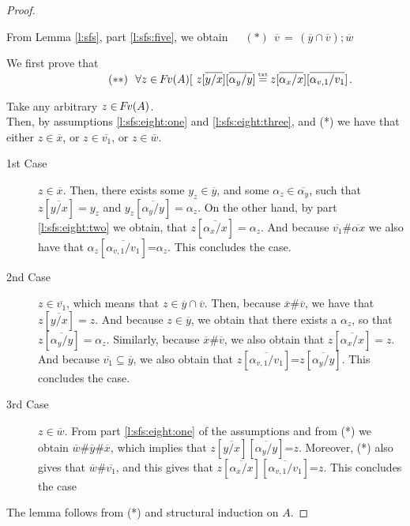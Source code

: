 \begin{proof}
$ ~ $

From Lemma \ref{l:sfs}, part \ref{l:sfs:five}, we obtain\  \ \ $(*)\ \  \overline v \, = \, (\overline {y}\cap\overline{v}); \overline w $

We first prove that \\
$\strut \hspace{3cm} \ \  (**) \ \  \forall z\in \fv(A)[\ z [\overline{y/x}] [\overline{\alpha_y/y}]   \txteq z [\overline{\alpha_x/x}] [\overline{\alpha_{v,1}/v_1}] $.
 
Take any arbitrary $z\in {\hspace{-1pt}F\hspace{-1pt}}v(A)$. \\
Then, by assumptions \ref{l:sfs:eight:one} and \ref{l:sfs:eight:three}, and (*) we have that either $z\in \overline x$, or $z\in \overline {v_1}$, or 
$z\in \overline {w}$.
 
  \begin{description}
 \item
 [  {1st Case}]  
 $z\in \overline x$. 
 Then, there exists some $y_z\in \overline y$, and some $\alpha_z \in \overline {\alpha_y}$, such that    $z[\overline{y/x}]=y_z$  and
  $y_z [\overline{\alpha_y/y}] = \alpha_z$. 
  On the other hand,   by part \ref{l:sfs:eight:two} we obtain, that  $z[\overline{\alpha_x/x}] =\alpha_z$.
  And because $\overline {v_1}\# \overline {\alpha x}$ we also have that $\alpha_z[\overline{\alpha_{v,1}/v_1}] $=$\alpha_z$. 
  This concludes the case.
  \item
   [  {2nd Case}]  
$ z\in \overline {v_1}$, which means that $ z\in \overline {y}\cap\overline{v}$. Then, because $\overline x \# \overline  v$, we have that $z[\overline{y/x}]=z$. 
And because $z\in \overline y$, we obtain that there exists a $\alpha_z$, so that  $z [\overline{\alpha_y/y}] = \alpha_z$.
Similarly, because  $\overline x \# \overline  v$, we also obtain that $z[\overline{\alpha_x/x}]=z$.
And because $\overline {v_1} \subseteq \overline y$, we also obtain that $z[\overline {\alpha_{v,1}/v_1}]$=$z[\overline {\alpha_{y}/y}]$.
This concludes the case.
  \item
     [   {3rd Case}]  
  $z\in \overline {w}$. From part  \ref{l:sfs:eight:one} of the assumptions and from (*) we obtain  $\overline {w} \#  \overline {y}\# \overline {x}$, which implies  that $z [\overline{y/x}] [\overline{\alpha_y/y}]$=$z$.
  Moreover, (*) also gives that $\overline {w} \#  \overline {v_1}$, and this gives that
  $z[\overline{\alpha_x/x}] [\overline{\alpha_{v,1}/v_1}] $=$z$.
  This concludes the case
\end{description}

The lemma follows from (*) and structural induction on $A$.
\end{proof}


